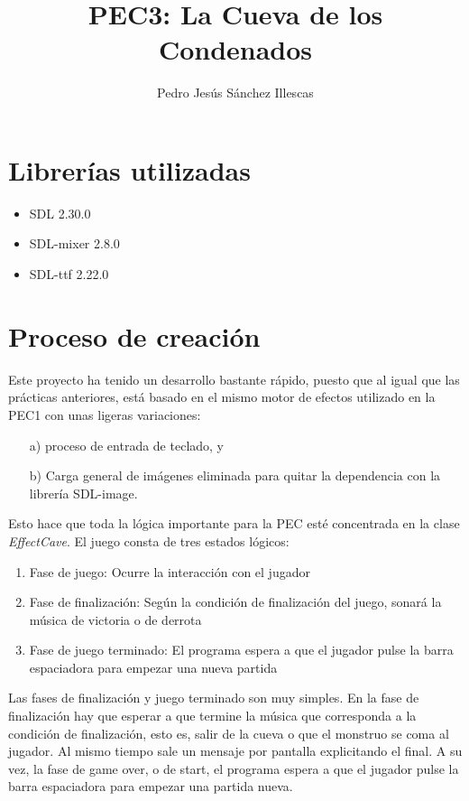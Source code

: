 \documentclass[12pt]{article}%
\begin{document}
\sloppy

\title{PEC3: La Cueva de los Condenados}
\author{Pedro Jesús Sánchez Illescas}

\maketitle

\newpage

\tableofcontents

\newpage

\section{Librerías utilizadas}
\begin{itemize}
	\item SDL 2.30.0
	\item SDL-mixer 2.8.0
	\item SDL-ttf 2.22.0
\end{itemize}

\section{Proceso de creación}
	
	Este proyecto ha tenido un desarrollo bastante rápido, puesto que al igual que las prácticas anteriores, está basado en el mismo motor de efectos utilizado en la PEC1 con unas ligeras variaciones:
\begin{itemize}
	\item[a)] proceso de entrada de teclado, y
	\item[b)] Carga general de imágenes eliminada para quitar la dependencia con la librería SDL-image.
\end{itemize}
	
	Esto hace que toda la lógica importante para la PEC esté concentrada en la clase \textit{EffectCave}. El juego consta de tres estados lógicos:
\begin{enumerate}
	\item Fase de juego: Ocurre la interacción con el jugador
	\item Fase de finalización: Según la condición de finalización del juego, sonará la música de victoria o de derrota
	\item Fase de juego terminado: El programa espera a que el jugador pulse la barra espaciadora para empezar una nueva partida
\end{enumerate}
	
	Las fases de finalización y juego terminado son muy simples. En la fase de finalización hay que esperar a que termine la música que corresponda a la condición de finalización, esto es, salir de la cueva o que el monstruo se coma al jugador. Al mismo tiempo sale un mensaje por pantalla explicitando el final. A su vez, la fase de game over, o de start, el programa espera a que el jugador pulse la barra espaciadora para empezar una partida nueva.
	
\end{document}
